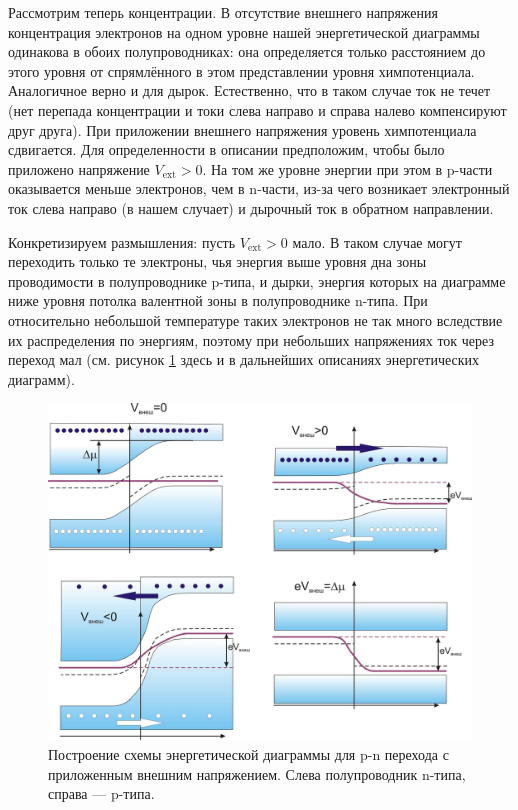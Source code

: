 \documentclass[a4paper, 12pt]{article}
\begin{document}
Рассмотрим теперь концентрации. В отсутствие внешнего напряжения концентрация электронов на одном уровне нашей энергетической диаграммы одинакова в обоих полупроводниках: она определяется только расстоянием до этого уровня от спрямлённого в этом представлении уровня химпотенциала. Аналогичное верно и для дырок. Естественно, что в таком случае ток не течет (нет перепада концентрации и токи слева направо и справа налево компенсируют друг друга). При приложении внешнего напряжения уровень химпотенциала сдвигается. Для определенности в описании предположим, чтобы было приложено напряжение $V_{\text{ext}} > 0$. На том же уровне энергии при этом в p-части оказывается меньше электронов, чем в n-части, из-за чего возникает электронный ток слева направо (в нашем случает) и дырочный ток в обратном направлении.

Конкретизируем размышления: пусть $V_{\text{ext}} > 0$ мало. В таком случае могут переходить только те электроны, чья энергия выше уровня дна зоны проводимости в полупроводнике p-типа, и дырки, энергия которых на диаграмме ниже уровня потолка валентной зоны в полупроводнике n-типа. При относительно небольшой температуре таких электронов не так много вследствие их распределения по энергиям, поэтому при небольших напряжениях ток через переход мал (см. рисунок \ref{fig:2_schemes} здесь и в дальнейших описаниях энергетических диаграмм).

\begin{figure}[H]
	\centering
	\includegraphics[width=\linewidth]{2_schemes}
	\caption{Построение схемы энергетической диаграммы для p-n перехода с приложенным внешним напряжением. Слева полупроводник n-типа, справа --- p-типа.}
	\label{fig:2_schemes}
\end{figure}
\end{document}
